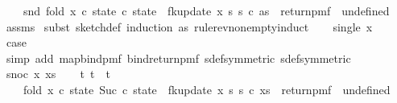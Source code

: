 \begin{isabellebody}
\ \ \ \ {\isacharparenleft}{\kern0pt}snd\ {\isacharparenleft}{\kern0pt}fold\ {\isacharparenleft}{\kern0pt}{\isasymlambda}x\ {\isacharparenleft}{\kern0pt}c{\isacharcomma}{\kern0pt}\ state{\isacharparenright}{\kern0pt}{\isachardot}{\kern0pt}\ {\isacharparenleft}{\kern0pt}c{\isacharplus}{\kern0pt}{}{\isacharcomma}{\kern0pt}\ state\ {\isasymbind}\ fk{\isacharunderscore}{\kern0pt}update{\isacharprime}{\kern0pt}\ x\ s\ s\ c{\isacharparenright}{\kern0pt}{\isacharparenright}{\kern0pt}\ as\ {\isacharparenleft}{\kern0pt}{}{\isacharcomma}{\kern0pt}\ return{\isacharunderscore}{\kern0pt}pmf\ {\isacharparenleft}{\kern0pt}{\isasymlambda}{\isacharunderscore}{\kern0pt}{\isachardot}{\kern0pt}\ undefined{\isacharparenright}{\kern0pt}{\isacharparenright}{\kern0pt}{\isacharparenright}{\kern0pt}{\isacharparenright}{\kern0pt}{\isachardoublequoteclose}\isanewline
%
\isadelimproof
\ \ %
\endisadelimproof
%
\isatagproof
{}\isamarkupfalse%
\ assms{\isacharparenleft}{\kern0pt}{}{\isacharparenright}{\kern0pt}\isanewline
{}\isamarkupfalse%
\ {\isacharparenleft}{\kern0pt}subst\ sketch{\isacharunderscore}{\kern0pt}def{\isacharcomma}{\kern0pt}\ induction\ as\ rule{\isacharcolon}{\kern0pt}rev{\isacharunderscore}{\kern0pt}nonempty{\isacharunderscore}{\kern0pt}induct{\isacharparenright}{\kern0pt}\isanewline
\ \ \isamarkupfalse%
\ {\isacharparenleft}{\kern0pt}single\ x{\isacharparenright}{\kern0pt}\isanewline
\ \ \isamarkupfalse%
\ \isamarkupfalse%
\ {\isacharquery}{\kern0pt}case\ \isanewline
\ \ \ \ \isamarkupfalse%
\ {\isacharparenleft}{\kern0pt}simp\ add{\isacharcolon}{\kern0pt}\ map{\isacharunderscore}{\kern0pt}bind{\isacharunderscore}{\kern0pt}pmf\ bind{\isacharunderscore}{\kern0pt}return{\isacharunderscore}{\kern0pt}pmf\ sdef{\isacharbrackleft}{\kern0pt}symmetric{\isacharbrackright}{\kern0pt}\ sdef{\isacharbrackleft}{\kern0pt}symmetric{\isacharbrackright}{\kern0pt}{\isacharparenright}{\kern0pt}\isanewline
{}\isamarkupfalse%
\isanewline
\ \ \isamarkupfalse%
\ {\isacharparenleft}{\kern0pt}snoc\ x\ xs{\isacharparenright}{\kern0pt}\isanewline
\ \ \isamarkupfalse%
\ t{}\ t{}\ \ t{\isacharcolon}{\kern0pt}\isanewline
\ \ \ \ {\isachardoublequoteopen}fold\ {\isacharparenleft}{\kern0pt}{\isasymlambda}x\ {\isacharparenleft}{\kern0pt}c{\isacharcomma}{\kern0pt}\ state{\isacharparenright}{\kern0pt}{\isachardot}{\kern0pt}\ {\isacharparenleft}{\kern0pt}Suc\ c{\isacharcomma}{\kern0pt}\ state\ {\isasymbind}\ fk{\isacharunderscore}{\kern0pt}update{\isacharprime}{\kern0pt}\ x\ s\ s\ c{\isacharparenright}{\kern0pt}{\isacharparenright}{\kern0pt}\ xs\ {\isacharparenleft}{\kern0pt}{}{\isacharcomma}{\kern0pt}\ return{\isacharunderscore}{\kern0pt}pmf\ {\isacharparenleft}{\kern0pt}{\isasymlambda}{\isacharunderscore}{\kern0pt}{\isachardot}{\kern0pt}\ undefined{\isacharparenright}{\kern0pt}{\isacharparenright}{\kern0pt}\ \isanewline

\end{isabellebody}
